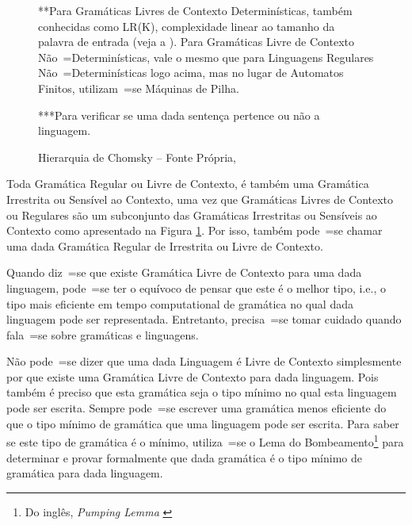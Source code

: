 {\begin{figure}[h]
\begin{minipage}{\textwidth}
    **Para Gramáticas Livres de Contexto Determinísticas,
    também conhecidas como LR(K),
    complexidade linear ao tamanho da palavra de entrada (veja a ).
    Para Gramáticas Livre de Contexto Não~=Determinísticas,
    vale o mesmo que para Linguagens Regulares Não~=Determinísticas logo acima,
    mas no lugar de Automatos Finitos,
    utilizam~=se Máquinas de Pilha.

    ***Para verificar se uma dada sentença pertence ou não a linguagem.
    \end{minipage}
    \caption[Hierarquia de Chomsky]{Hierarquia de Chomsky -- Fonte Própria\protect\footnotemark,
    }
    \label{fig:pictures/HierarquiaDeChomsky.png}
    \end{figure}

    Toda Gramática Regular ou
    Livre de Contexto,
    é também uma Gramática Irrestrita ou
    Sensível ao Contexto,
    uma vez que Gramáticas Livres de Contexto ou
    Regulares são um subconjunto das Gramáticas Irrestritas ou
    Sensíveis ao Contexto como apresentado na Figura \ref{fig:pictures/HierarquiaDeChomsky.png}.
    Por isso,
    também pode~=se chamar uma dada Gramática Regular de Irrestrita ou
    Livre de Contexto.

    Quando diz~=se que existe Gramática Livre de Contexto para uma dada linguagem,
    pode~=se ter o equívoco de pensar que este é o melhor tipo,
    i.e.,
    o tipo mais eficiente em tempo computational de gramática no qual dada linguagem pode ser representada.
    Entretanto,
    precisa~=se tomar cuidado quando fala~=se sobre gramáticas e
    linguagens.

    Não pode~=se dizer que uma dada Linguagem é Livre de Contexto simplesmente por que existe uma Gramática Livre de Contexto para dada linguagem.
    Pois também é preciso que esta gramática seja o tipo mínimo no qual esta linguagem pode ser escrita.
    Sempre pode~=se escrever uma gramática menos eficiente do que o tipo mínimo de gramática que uma linguagem pode ser escrita.
    Para saber se este tipo de gramática é o mínimo,
    utiliza~=se o Lema do Bombeamento\footnote{
    Do inglês, \textit{Pumping Lemma} \cite{hopcroftBook,sipserBook}
    }
    para determinar e
    provar formalmente que dada gramática é o tipo mínimo de gramática para dada linguagem.


}
